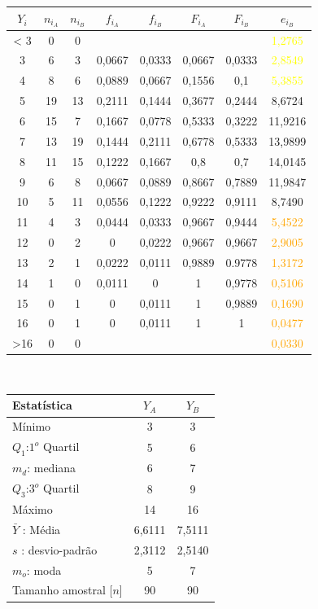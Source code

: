 \begin{minipage}{0pt}
\begin{tabular}{ |c|c|c|c|c|c|c|c| }
\hline
\rowcolor[gray]{0.7}
$Y_i$ & $n_{i_A}$ & $n_{i_B}$ & $f_{i_A}$ & $f_{i_B}$ & $F_{i_A}$ & $F_{i_B}$ & $e_{i_B}$ \\
\hline
< 3 & 0 & 0 & & & & & \textcolor{yellow}{1,2765} \\
\hline
3 & 6 & 3 & 0,0667 & 0,0333 & 0,0667 & 0,0333 & \textcolor{yellow}{2,8549} \\
\hline
4 & 8 & 6 & 0,0889 & 0,0667 & 0,1556 & 0,1 & \textcolor{yellow}{5,3855} \\
\hline
5 & 19 & 13 & 0,2111 & 0,1444 & 0,3677 & 0,2444 & 8,6724 \\
\hline
6 & 15 & 7 & 0,1667 & 0,0778 & 0,5333 & 0,3222 & 11,9216 \\
\hline
7 & 13 & 19 & 0,1444 & 0,2111 & 0,6778 & 0,5333 & 13,9899 \\
\hline
8 & 11 & 15 & 0,1222 & 0,1667 & 0,8 & 0,7 & 14,0145 \\
\hline
9 & 6 & 8 & 0,0667 & 0,0889 & 0,8667 & 0,7889 & 11,9847 \\
\hline
10 & 5 & 11 & 0,0556 & 0,1222 & 0,9222 & 0,9111 & 8,7490 \\
\hline
11 & 4 & 3 & 0,0444 & 0,0333 & 0,9667 & 0,9444 & \textcolor{orange}{5,4522}\\
\hline
12 & 0 & 2 & 0 & 0,0222 & 0,9667 & 0,9667 & \textcolor{orange}{2,9005} \\
\hline
13 & 2 & 1 & 0,0222 & 0,0111 & 0,9889 & 0.9778 & \textcolor{orange}{1,3172} \\
\hline
14 & 1 & 0 & 0,0111 & 0 & 1 & 0,9778 & \textcolor{orange}{0,5106} \\
\hline
15 & 0 & 1 & 0 & 0,0111 & 1 & 0,9889 & \textcolor{orange}{0,1690} \\
\hline
16 & 0 & 1 & 0 & 0,0111 & 1 & 1 & \textcolor{orange}{0,0477} \\
\hline
>16 & 0 & 0 & & & & & \textcolor{orange}{0,0330} \\
\hline
\end{tabular}
\end{minipage}
\\
\begin{minipage}[!b]{0.40\linewidth}
\begin{tabular}{ l c c }
\hline
Estatística & $Y_A$ & $Y_B$ \\
\hline
Mínimo & 3 & 3 \\
$Q_1$:$1^o$ Quartil & 5 & 6 \\
$m_d$: mediana & 6 & 7 \\
$Q_3$:$3^o$ Quartil & 8 & 9 \\
Máximo & 14 & 16 \\
\hline
$\bar{Y}$ : Média & 6,6111 & 7,5111 \\
$s$ : desvio-padrão & 2,3112 & 2,5140\\
$m_o$: moda & 5 & 7\\
\hline
Tamanho amostral [$n$] & 90 & 90 \\
\hline
\end{tabular}
\label{Tab:Resulatdos}
\end{minipage}
